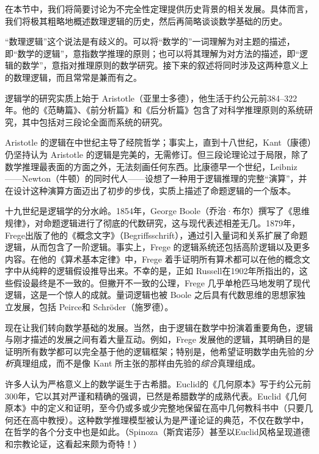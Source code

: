 \documentclass[../../../include/open-logic-section]{subfiles}
\begin{document}


在本节中，我们将简要讨论为不完全性定理提供历史背景的相关发展。具体而言，我们将极其粗略地概述数理逻辑的历史，然后再简略谈谈数学基础的历史。

\begin{digress}
  “数理逻辑”这个说法是有歧义的。可以将“数学的”一词理解为对主题的描述，即“数学的逻辑”，意指数学推理的原则；也可以将其理解为对方法的描述，即“逻辑的数学”，意指对推理原则的数学研究。接下来的叙述将同时涉及这两种意义上的数理逻辑，而且常常是兼而有之。
\end{digress}

逻辑学的研究实质上始于 Aristotle（亚里士多德），他生活于约公元前384--322年。他的《范畴篇》、《前分析篇》和《后分析篇》包含了对科学推理原则的系统研究，其中包括对三段论全面而系统的研究。

Aristotle 的逻辑在中世纪主导了经院哲学；事实上，直到十八世纪，Kant（康德）仍坚持认为 Aristotle 的逻辑是完美的，无需修订。但三段论理论过于局限，除了数学推理最表面的方面之外，无法刻画任何东西。比康德早一个世纪，Leibniz——Newton（牛顿）的同时代人——设想了一种用于逻辑推理的完整“演算”，并在设计这种演算方面迈出了初步的步伐，实质上描述了命题逻辑的一个版本。

十九世纪是逻辑学的分水岭。1854年，George Boole（乔治·布尔）撰写了《思维规律》，对命题逻辑进行了彻底的代数研究，这与现代表述相差无几。1879年，Frege出版了他的《概念文字》（Begriffsschrift），通过引入量词和关系扩展了命题逻辑，从而包含了一阶逻辑。事实上，Frege 的逻辑系统还包括高阶逻辑以及更多内容。在他的《算术基本定律》中，Frege 着手证明所有算术都可以在他的概念文字中从纯粹的逻辑假设推导出来。不幸的是，正如 Russell在1902年所指出的，这些假设最终是不一致的。但撇开不一致的公理，Frege 几乎单枪匹马地发明了现代逻辑，这是一个惊人的成就。量词逻辑也被 Boole 之后具有代数思维的思想家独立发展，包括 Peirce和 Schröder（施罗德）。

现在让我们转向数学基础的发展。当然，由于逻辑在数学中扮演着重要角色，逻辑与刚才描述的发展之间有着大量互动。例如，Frege 发展他的逻辑，其明确目的是证明所有数学都可以完全基于他的逻辑框架；特别是，他希望证明数学由先验的\emph{分析}真理组成，而不是像 Kant 所主张的那样由先验的\emph{综合}真理组成。

许多人认为严格意义上的数学诞生于古希腊。Euclid的《几何原本》写于约公元前300年，它以其对严谨和精确的强调，已然是希腊数学的成熟代表。Euclid《几何原本》中的定义和证明，至今仍或多或少完整地保留在高中几何教科书中（只要几何还在高中教授）。这种数学推理模型被认为是严谨论证的典范，不仅在数学中，在哲学的各个分支中也是如此。（Spinoza（斯宾诺莎）甚至以Euclid风格呈现道德和宗教论证，这看起来颇为奇特！）
\end{document}
